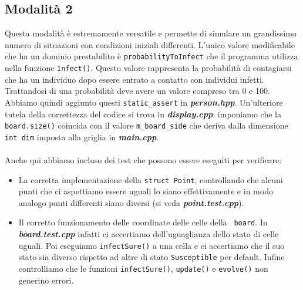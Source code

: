 \documentclass[a4paper,10 pt]{article}
\begin{document}
\subsection{Modalità 2}
Questa modalità è estremamente versatile e permette di simulare un grandissimo numero di situazioni con condizioni iniziali differenti. L'unico valore modificabile che ha un dominio prestabilito è \verb!probabilityToInfect! che il programma utilizza nella funzione \verb!Infect()!. Questo valore rappresenta la probabilità di contagiarsi che ha un individuo dopo essere entrato a contatto con individui infetti. Trattandosi di una probabilità deve avere un valore compreso tra 0 e 100. Abbiamo quindi aggiunto questi \verb!static_assert! in \textbf{\textit{person.hpp}}. Un'ulteriore tutela della correttezza del codice si trova in \textbf{\textit{display.cpp}}: imponiamo che la \verb!board.size()! coincida con il valore \verb!m_board_side! che deriva dalla dimensione \verb!int dim! imposta alla griglia in \textbf{\textit{main.cpp}}.
\ \\
\ \\
Anche qui abbiamo incluso dei test che possono essere eseguiti per verificare:
\begin{itemize}
\item La corretta implementazione della \verb!struct Point!, controllando che alcuni punti che ci aspettiamo essere uguali lo siano effettivamente e in modo analogo punti differenti siano diversi (si veda  \textbf{\textit{point.test.cpp}}).
\item Il corretto funzionamento delle coordinate delle celle della \verb! board!. In \textbf{\textit{board.test.cpp}} infatti ci accertiamo dell'uguaglianza dello stato di celle uguali. Poi eseguiamo \verb!infectSure()! a una cella e ci accertiamo che il suo stato sia diverso rispetto ad altre di stato \verb!Susceptible! per default. Infine controlliamo che le funzioni \verb!infectSure()!, \verb!update()! e \verb!evolve()! non generino errori.
 \end{itemize}
\end{document}
